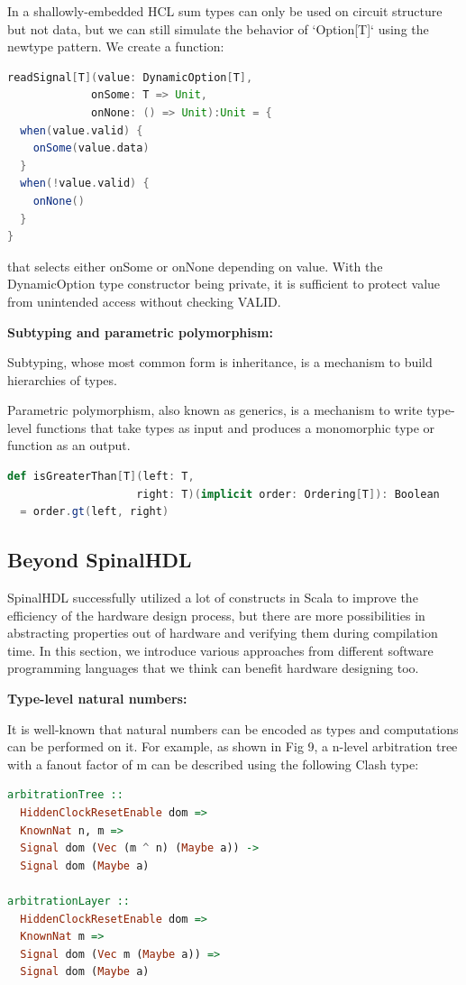 \documentclass{article}
\begin{document}
In a shallowly-embedded HCL sum types can only be used on circuit structure but not data, but we can still simulate the behavior of `Option[T]` using the newtype pattern. We create a function:

\begin{lstlisting}[language=scala]
readSignal[T](value: DynamicOption[T], 
             onSome: T => Unit, 
             onNone: () => Unit):Unit = {
  when(value.valid) {
    onSome(value.data)
  }
  when(!value.valid) {
    onNone()
  }
}
\end{lstlisting}
that selects either onSome or onNone depending on value. With the DynamicOption type constructor being private, it is sufficient to protect value from unintended access without checking VALID.

\textbf{Subtyping and parametric polymorphism: }

Subtyping, whose most common form is inheritance, is a mechanism to build hierarchies of types. 

Parametric polymorphism, also known as generics, is a mechanism to write type-level functions that take types as input and produces a monomorphic type or function as an output.

\begin{lstlisting}[language=scala]
def isGreaterThan[T](left: T, 
                    right: T)(implicit order: Ordering[T]): Boolean
  = order.gt(left, right)
\end{lstlisting}

\subsection{Beyond SpinalHDL}
SpinalHDL successfully utilized a lot of constructs in Scala to improve the efficiency of the hardware design process, but there are more possibilities in abstracting properties out of hardware and verifying them during compilation time. In this section, we introduce various approaches from different software programming languages that we think can benefit hardware designing too.

\textbf{Type-level natural numbers:}

It is well-known that natural numbers can be encoded as types and computations can be performed on it. For example, as shown in Fig 9, a n-level arbitration tree with a fanout factor of m can be described using the following Clash type:

\begin{lstlisting}[language=Haskell]
arbitrationTree ::
  HiddenClockResetEnable dom =>
  KnownNat n, m =>
  Signal dom (Vec (m ^ n) (Maybe a)) ->
  Signal dom (Maybe a)

arbitrationLayer ::
  HiddenClockResetEnable dom =>
  KnownNat m =>
  Signal dom (Vec m (Maybe a)) =>
  Signal dom (Maybe a)
\end{lstlisting}
\end{document}
